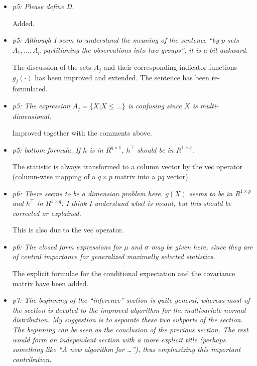 \documentclass[11pt,a4paper]{article}
\begin{document}
\begin{itemize}
  
  \item \textit{p5: Please define D.}
        
	Added.
	
  \item \textit{p5: Although I seem to understand the meaning of the sentence
        ``by $p$ sets $A_1, \dots , A_p$ partitioning the observations into two
	groups'', it is a bit awkward.}
	
	The discussion of the sets $A_j$ and their corresponding indicator functions
	$g_j(\cdot)$ has been improved and extended. The sentence has been re-formulated.
	
  \item \textit{p5: The expression $A_j = \{ X | X \le \dots\}$ is confusing since
        $X$ is multi-dimensional.}
	
	Improved together with the comments above.
	
  \item \textit{p5: bottom formula. If $h$ is in $R^{q \times 1}$, $h^\top$ should be
        in $R^{1 \times q}$.}
	
	The statistic is always transformed to a column vector by the vec operator
        (column-wise mapping of a $q \times p$ matrix into a $pq$ vector).
	
  \item \textit{p6: There seems to be a dimension problem here. $g(X)$ seems to be
        in $R^{1 \times p}$ and $h^\top$ in $R^{1 \times q}$. I think I understand
	what is meant, but this should be corrected or explained.}
	
	This is also due to the vec operator.
	
  \item \textit{p6: The closed form expressions for $\mu$ and $\sigma$ may be
        given here, since they are of central importance for generalized maximally
	selected statistics.}
	
	The explicit formulae for the conditional expectation and the covariance matrix
	have been added.
	
  \item \textit{p7: The beginning of the ``inference'' section is quite general,
        whereas most of the section is devoted to the improved algorithm for the
	multivariate normal distribution. My suggestion is to separate these two
	subparts of the section. The beginning can be seen as the conclusion of
	the previous section. The rest would form an independent section with a
	more explicit title (perhaps something like ``A new algorithm for \dots''),
	thus emphasizing this important contribution.}
	

\end{itemize}
\end{document}
